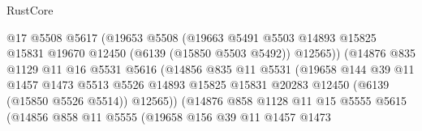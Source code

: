 \begin{lexlean}{RustCore}
\begin{coremodule}
                                  @17
                                  @5508
                                  @5617
                                  (@19653
                                    @5508
                                    (@19663
                                      @5491
                                      @5503
                                      @14893
                                      @15825
                                      @15831
                                      @19670
                                      @12450
                                      (@6139 (@15850 @5503 @5492))
                                      @12565))
                                  (@14876
                                    @835
                                    @1129
                                    @11
                                    @16
                                    @5531
                                    @5616
                                    (@14856
                                      @835
                                      @11
                                      @5531
                                      (@19658
                                        @144
                                        @39
                                        @11
                                        @1457
                                        @1473
                                        @5513
                                        @5526
                                        @14893
                                        @15825
                                        @15831
                                        @20283
                                        @12450
                                        (@6139 (@15850 @5526 @5514))
                                        @12565))
                                    (@14876
                                      @858
                                      @1128
                                      @11
                                      @15
                                      @5555
                                      @5615
                                      (@14856
                                        @858
                                        @11
                                        @5555
                                        (@19658
                                          @156
                                          @39
                                          @11
                                          @1457
                                          @1473

\end{coremodule}
\end{lexlean}
